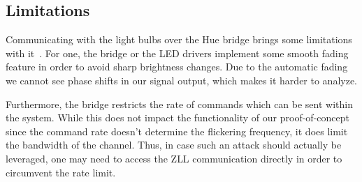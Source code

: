 \subsection{Limitations} %
\label{sec:exp:limitations}


Communicating with the light bulbs over the Hue bridge brings some limitations with it~\cite{Ronen:2016:EFAIDCSL}. For one, the bridge or the LED drivers implement some smooth fading feature in order to avoid sharp brightness changes. Due to the automatic fading we cannot see phase shifts in our signal output, which makes it harder to analyze.

Furthermore, the bridge restricts the rate of commands which can be sent within the system.
While this does not impact the functionality of our proof-of-concept since the command rate doesn't determine the flickering frequency, it does limit the bandwidth of the channel.
Thus, in case such an attack should actually be leveraged, one may need to access the ZLL communication directly in order to circumvent the rate limit.

